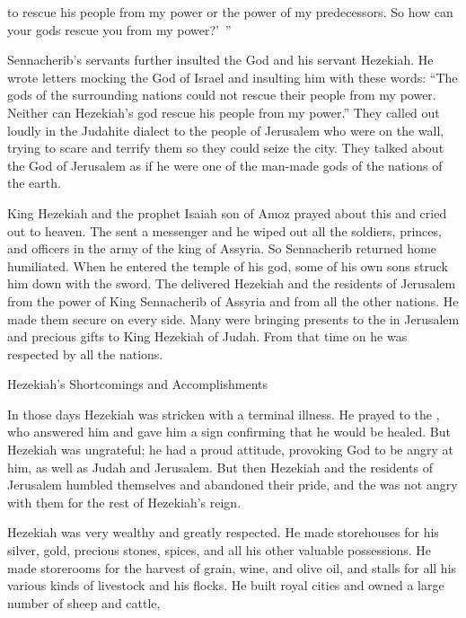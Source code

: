 {to rescue
his people
from my power
or the power
of my predecessors.
So how can your gods
rescue
you from my power?’ ”
\par }{\PP {}Sennacherib’s
servants
further insulted the
{}
God
and his servant
Hezekiah.
He wrote
letters
mocking
the {}
God
of Israel
and insulting him with these words: “The gods
of the surrounding
nations
could
not
rescue
their people
from my power.
Neither can Hezekiah’s
god
rescue
his people
from my power.”
They called
out loudly
in the Judahite dialect
to
the people
of Jerusalem
who
were on
the wall,
trying to scare
and terrify
them so
they could seize
the
city.
They talked
about the God
of Jerusalem
as if he were one
of the
man-made
gods
of the nations
of the earth.
\par }{\PP {}King
Hezekiah
and the prophet
Isaiah
son
of Amoz
prayed
about this
and cried
out to heaven.
The
{}
sent
a messenger
and he wiped out
all
the soldiers,
princes,
and officers
in the army
of the king
of Assyria.
So Sennacherib returned
home
humiliated.
When he entered
the temple
of his god,
some of his own sons
struck
him down
with the sword.
The
{}
delivered
Hezekiah
and the residents
of Jerusalem
from the power
of King
Sennacherib
of Assyria
and from
all
the other nations. He made them secure
on every side.
Many
were bringing
presents
to the
{}
in Jerusalem
and precious
gifts to King
Hezekiah
of Judah.
From that time on he was respected
by all
the nations.
\par }{\SH Hezekiah’s Shortcomings and Accomplishments
\par }{\PP {}In those
days
Hezekiah
was stricken
with a terminal
illness. He prayed
to
the {}, who answered
him and gave
him a sign confirming that he would be healed.
But
Hezekiah
was ungrateful;
he had a proud
attitude, provoking
God to be
angry
at him,
as well as Judah
and Jerusalem.
But then Hezekiah
and the residents
of Jerusalem
humbled
themselves and abandoned their pride,
and the
{}
was not
angry
with them for the rest
of Hezekiah’s reign.
\par }{\PP {}Hezekiah
was very wealthy
and greatly
respected. He made
storehouses
for his silver,
gold,
precious
stones,
spices,
and all
his other valuable
possessions.
He made storerooms
for the harvest
of grain,
wine,
and olive oil,
and stalls
for all
his various kinds
of livestock
and his flocks.
He built
royal cities
and owned
a large number
of sheep
and cattle,
}
